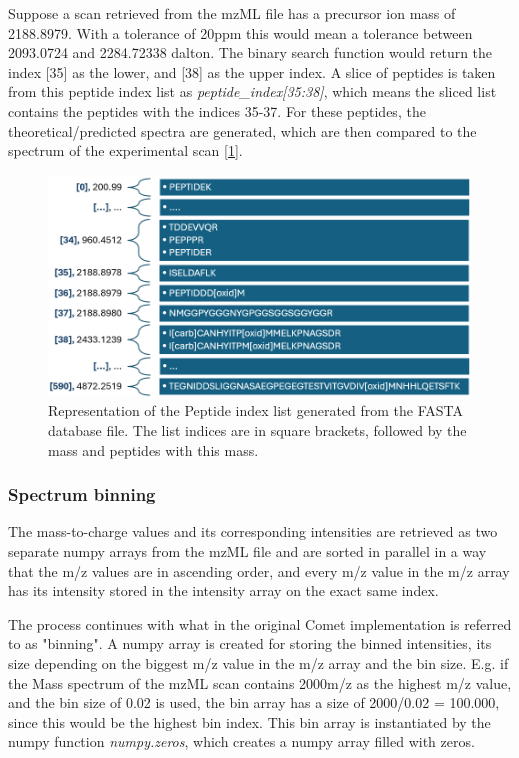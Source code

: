\documentclass[11pt]{article}
\begin{document}
Suppose a scan retrieved from the mzML file has a precursor ion mass of 2188.8979. With a tolerance of 20ppm this would mean a tolerance between 2093.0724 and 2284.72338 dalton. The binary search function would return the index [35] as the lower, and [38] as the upper index. A slice of peptides is taken  from this peptide index list as \textit{peptide\_index[35:38]}, which means the sliced list contains the peptides with the indices 35-37. For these peptides, the theoretical/predicted spectra are generated, which are then compared to the spectrum of the experimental scan [\cref{fig:peptindex}].

\begin{figure}[ht]
\centering
\includegraphics[width=1\textwidth]{figs/pepindex.png}
\caption{Representation of the Peptide index list generated from the FASTA database file. The list indices are in square brackets, followed by the mass and peptides with this mass.}
\label{fig:peptindex}
\end{figure}

\subsubsection{Spectrum binning}\label{SpectBinningChapter}
The mass-to-charge values and its corresponding intensities are retrieved as two separate numpy arrays from the mzML file and are sorted in parallel in a way that the m/z values are in ascending order, and every m/z value in the m/z array has its intensity stored in the intensity array on the exact same index.

The process continues with what in the original Comet implementation is referred to as "binning". A numpy array is created for storing the binned intensities, its size depending on the biggest m/z value in the m/z array and the bin size. E.g. if the Mass spectrum of the mzML scan contains 2000m/z as the highest m/z value, and the bin size of 0.02 is used, the bin array has a size of 2000/0.02 = 100.000, since this would be the highest bin index. This bin array is instantiated by the numpy function \textit{numpy.zeros}, which creates a numpy array filled with zeros.
\end{document}

